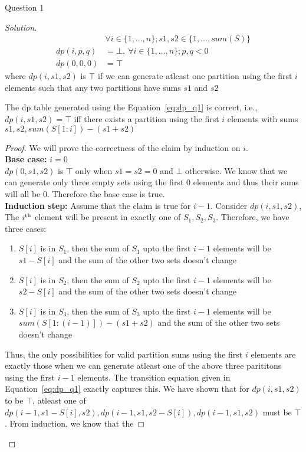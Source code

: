 \begin{solution}{Question 1}
\begin{proof}[Solution]
\begin{equation}
\begin{split}
                &\forall i\in \{1, \ldots, n\}; s1, s2\in\{1, \ldots, sum(S)\}\\
                dp(i, p, q) &= \bot,\ \forall i\in \{1, \ldots, n\}; p, q < 0\\
                dp(0, 0, 0) &= \top
            \end{split}
        \end{equation}
        where $dp(i, s1, s2)$ is $\top$ if we can generate atleast one partition using the first $i$ elements such that any two partitions have sums $s1$ and $s2$
        \begin{claim}\label{claim:dp_q1}
            The dp table generated using the Equation~\ref{eq:dp_q1} is correct, i.e., $dp(i, s1, s2)=\top$ iff there exists a partition using the first $i$ elements with sums $s1, s2, sum(S[1:i])-(s1+s2)$
        \end{claim}
        \begin{proof}
            We will prove the correctness of the claim by induction on $i$.\\
            \textbf{Base case:} $i=0$\\
            $dp(0, s1, s2)$ is $\top$ only when $s1=s2=0$ and $\bot$ otherwise. We know that we can generate only three empty sets using the first $0$ elements and thus their sums will all be $0$. Therefore the base case is true.\\
            \textbf{Induction step:} Assume that the claim is true for $i-1$. Consider $dp(i, s1, s2)$,\\
            The $i\textsuperscript{th}$ element will be present in exactly one of $S_1, S_2, S_3$. Therefore, we have three cases:
            \begin{enumerate}
                \item $S[i]$ is in $S_1$, then the sum of $S_1$ upto the first $i-1$ elements will be $s1-S[i]$ and the sum of the other two sets doesn't change
                \item $S[i]$ is in $S_2$, then the sum of $S_2$ upto the first $i-1$ elements will be $s2-S[i]$ and the sum of the other two sets doesn't change
                \item $S[i]$ is in $S_3$, then the sum of $S_3$ upto the first $i-1$ elements will be $sum(S[1:(i-1)])-(s1+s2)$ and the sum of the other two sets doesn't change
            \end{enumerate}
            Thus, the only possibilities for valid partition sums using the first $i$ elements are exactly those when we can generate atleast one of the above three parititons using the first $i-1$ elements. The transition equation given in Equation~\ref{eq:dp_q1} exactly captures this. We have shown that for $dp(i, s1, s2)$ to be $\top$, atleast one of $dp(i-1, s1-S[i], s2), dp(i-1, s1, s2-S[i]), dp(i-1, s1, s2)$ must be $\top$. From induction, we know that the

\end{proof}
\end{proof}
\end{solution}
